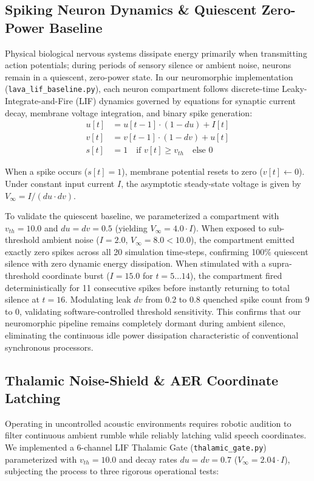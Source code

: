 \documentclass[journal,twocolumn]{IEEEtran}
\begin{document}
\subsection{Spiking Neuron Dynamics \& Quiescent Zero-Power Baseline}
Physical biological nervous systems dissipate energy primarily when transmitting action potentials; during periods of sensory silence or ambient noise, neurons remain in a quiescent, zero-power state. In our neuromorphic implementation (\texttt{lava\_lif\_baseline.py}), each neuron compartment follows discrete-time Leaky-Integrate-and-Fire (LIF) dynamics governed by equations for synaptic current decay, membrane voltage integration, and binary spike generation:
\begin{align}
u[t] &= u[t-1] \cdot (1 - du) + I[t] \\
v[t] &= v[t-1] \cdot (1 - dv) + u[t] \\
s[t] &= 1 \quad \text{if } v[t] \ge v_{th} \quad \text{else } 0
\end{align}

When a spike occurs ($s[t] = 1$), membrane potential resets to zero ($v[t] \leftarrow 0$). Under constant input current $I$, the asymptotic steady-state voltage is given by $V_\infty = I / (du \cdot dv)$.

To validate the quiescent baseline, we parameterized a compartment with $v_{th} = 10.0$ and $du = dv = 0.5$ (yielding $V_\infty = 4.0 \cdot I$). When exposed to sub-threshold ambient noise ($I = 2.0$, $V_\infty = 8.0 < 10.0$), the compartment emitted exactly zero spikes across all 20 simulation time-steps, confirming 100\% quiescent silence with zero dynamic energy dissipation. When stimulated with a supra-threshold coordinate burst ($I = 15.0$ for $t = 5 \dots 14$), the compartment fired deterministically for 11 consecutive spikes before instantly returning to total silence at $t = 16$. Modulating leak $dv$ from 0.2 to 0.8 quenched spike count from 9 to 0, validating software-controlled threshold sensitivity. This confirms that our neuromorphic pipeline remains completely dormant during ambient silence, eliminating the continuous idle power dissipation characteristic of conventional synchronous processors.

\subsection{Thalamic Noise-Shield \& AER Coordinate Latching}
Operating in uncontrolled acoustic environments requires robotic audition to filter continuous ambient rumble while reliably latching valid speech coordinates. We implemented a 6-channel LIF Thalamic Gate (\texttt{thalamic\_gate.py}) parameterized with $v_{th} = 10.0$ and decay rates $du = dv = 0.7$ ($V_\infty = 2.04 \cdot I$), subjecting the process to three rigorous operational tests:
\end{document}

